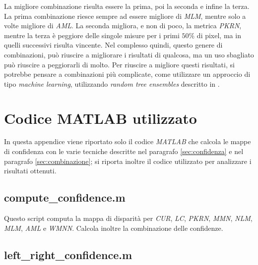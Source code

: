 \documentclass[12pt]{report}
\begin{document}
		
			La migliore combinazione risulta essere la prima, poi la seconda e infine la terza. La prima combinazione riesce sempre ad essere migliore di \textit{MLM}, mentre solo a volte migliore di \textit{AML}. La seconda migliora, e non di poco, la metrica \textit{PKRN}, mentre la terza è peggiore delle singole misure per i primi $50 \%$ di pixel, ma in quelli successivi risulta vincente. Nel complesso quindi, questo genere di combinazioni, può riuscire a migliorare i risultati di qualcosa, ma un uso sbagliato può riuscire a peggiorarli di molto. \newline
			Per riuscire a migliore questi risultati, si potrebbe pensare a combinazioni più complicate, come utilizzare un approccio di tipo \textit{machine learning}, utilizzando \textit{random tree ensembles} descritto in \cite{combinazioni_complicate}.
	

	\appendix 
	\renewcommand\chaptername{Appendice}
	
	\chapter{Codice MATLAB utilizzato}
	\label{sec:codice}
	
		In questa appendice viene riportato solo il codice \textit{MATLAB} che calcola le mappe di confidenza con le varie tecniche descritte nel paragrafo \ref{sec:confidenza} e nel paragrafo \ref{sec:combinazione}; si riporta inoltre il codice utilizzato per analizzare i risultati ottenuti.
	
		\section{compute\_confidence.m}
		\label{sec:computeConfidence}
		
			Questo script computa la mappa di disparità per \textit{CUR}, \textit{LC}, \textit{PKRN}, \textit{MMN}, \textit{NLM}, \textit{MLM}, \textit{AML} e \textit{WMNN}. Calcola inoltre la combinazione delle confidenze.
	
			
		
		\section{left\_right\_confidence.m}
		\label{sec:leftright}
			
		
\end{document}
